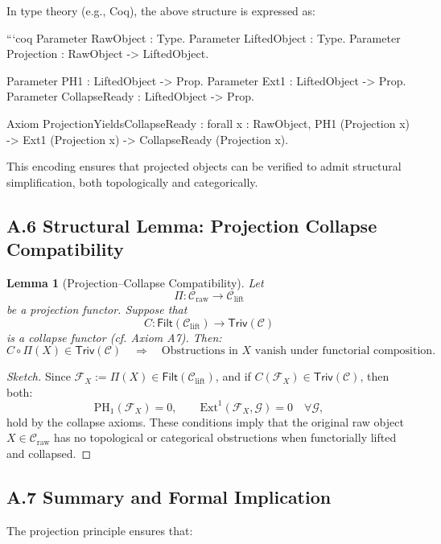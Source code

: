\documentclass[11pt]{article}
\newtheorem{lemma}[theorem]{Lemma}
\begin{document}
In type theory (e.g., Coq), the above structure is expressed as:

```coq
Parameter RawObject : Type.
Parameter LiftedObject : Type.
Parameter Projection : RawObject -> LiftedObject.

Parameter PH1 : LiftedObject -> Prop.
Parameter Ext1 : LiftedObject -> Prop.
Parameter CollapseReady : LiftedObject -> Prop.

Axiom ProjectionYieldsCollapseReady :
  forall x : RawObject,
    PH1 (Projection x) ->
    Ext1 (Projection x) ->
    CollapseReady (Projection x).

This encoding ensures that projected objects can be verified to admit structural simplification, both topologically and categorically.

\subsection*{A.6 Structural Lemma: Projection Collapse Compatibility}

\begin{lemma}[Projection--Collapse Compatibility]
Let 
\[
\Pi: \mathcal{C}_{\mathrm{raw}} \to \mathcal{C}_{\mathrm{lift}}
\]
be a projection functor. Suppose that 
\[
C: \mathsf{Filt}(\mathcal{C}_{\mathrm{lift}}) \to \mathsf{Triv}(\mathcal{C})
\]
is a collapse functor (cf. Axiom A7). Then:
\[
C \circ \Pi(X) \in \mathsf{Triv}(\mathcal{C}) \quad \Rightarrow \quad
\text{Obstructions in } X \text{ vanish under functorial composition}.
\]
\end{lemma}

\begin{proof}[Sketch]
Since \( \mathcal{F}_X := \Pi(X) \in \mathsf{Filt}(\mathcal{C}_{\mathrm{lift}}) \),  
and if \( C(\mathcal{F}_X) \in \mathsf{Triv}(\mathcal{C}) \), then both:
\[
\mathrm{PH}_1(\mathcal{F}_X) = 0, \qquad \mathrm{Ext}^1(\mathcal{F}_X, \mathcal{G}) = 0 \quad \forall \mathcal{G},
\]
hold by the collapse axioms. These conditions imply that the original raw object \( X \in \mathcal{C}_{\mathrm{raw}} \)  
has no topological or categorical obstructions when functorially lifted and collapsed.
\end{proof}

\subsection*{A.7 Summary and Formal Implication}

The projection principle ensures that:
\end{document}
